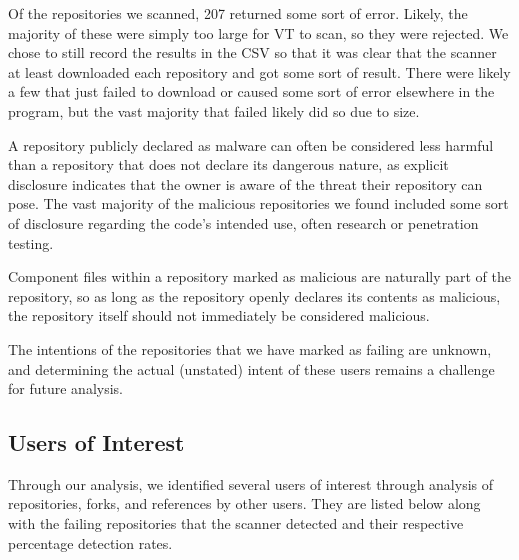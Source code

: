 \documentclass[]{acmart}
\begin{document}
Of the repositories we scanned, 207 returned some sort of error. Likely, the majority of these were simply too large for VT to scan, so they were rejected. We chose to still record the results in the CSV so that it was clear that the scanner at least downloaded each repository and got some sort of result. There were likely a few that just failed to download or caused some sort of error elsewhere in the program, but the vast majority that failed likely did so due to size.

A repository publicly declared as malware can often be considered less harmful than a repository that does not declare its dangerous nature, as explicit disclosure indicates that the owner is aware of the threat their repository can pose. The vast majority of the malicious repositories we found included some sort of disclosure regarding the code's intended use, often research or penetration testing. 

Component files within a repository marked as malicious are naturally part of the repository, so as long as the repository openly declares its contents as malicious, the repository itself should not immediately be considered malicious. 

The intentions of the repositories that we have marked as failing are unknown, and determining the actual (unstated) intent of these users remains a challenge for future analysis.
\subsection{Users of Interest}
Through our analysis, we identified several users of interest through analysis of repositories, forks, and references by other users. They are listed below along with the failing repositories that the scanner detected and their respective percentage detection rates.
\end{document}
